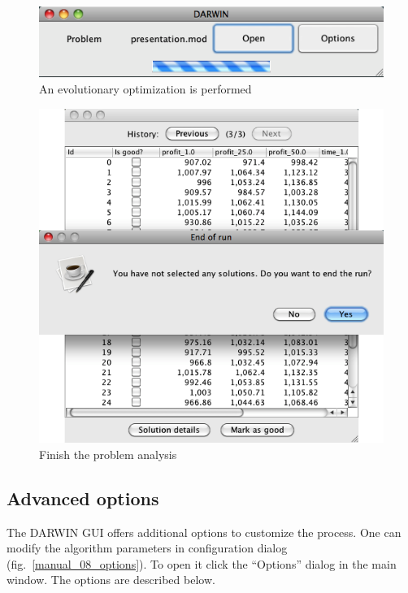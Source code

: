 \begin{figure}
  \centering
  \includegraphics[scale=0.7]{img/manual/06_evolutionary_loop}
  \caption{An evolutionary optimization is performed}
  \label{manual_06_evo_loop}
\end{figure}

\begin{figure}
  \centering
  \includegraphics[scale=0.7]{img/manual/07_end_of_run}
  \caption{Finish the problem analysis}
  \label{manual_07_finish}
\end{figure}

\clearpage{}
\subsection*{Advanced options}

The DARWIN GUI offers additional options to customize the process. One can
modify the algorithm parameters in configuration dialog
(fig.~\ref{manual_08_options}). To open it click the ``Options'' dialog in the
main window. The options are described below.

